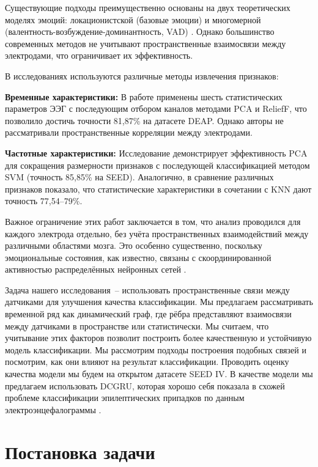 \documentclass[12pt, twoside]{article}
\begin{document}
Существующие подходы преимущественно основаны на двух теоретических моделях эмоций: локационистской (базовые эмоции) и многомерной (валентность-возбуждение-доминантность, VAD) \cite{3}. Однако большинство современных методов не учитывают пространственные взаимосвязи между электродами, что ограничивает их эффективность.

В исследованиях используются различные методы извлечения признаков:

\textbf{Временные характеристики:} В работе \cite{4} применены шесть статистических параметров ЭЭГ с последующим отбором каналов методами PCA и ReliefF, что позволило достичь точности 81{,}87\% на датасете DEAP. Однако авторы не рассматривали пространственные корреляции между электродами.

\textbf{Частотные характеристики:} Исследование \cite{5} демонстрирует эффективность PCA для сокращения размерности признаков с последующей классификацией методом SVM (точность 85{,}85\% на SEED). Аналогично, в \cite{6} сравнение различных признаков показало, что статистические характеристики в сочетании с KNN дают точность 77{,}54--79\%.

Важное ограничение этих работ заключается в том, что анализ проводился для каждого электрода отдельно, без учёта пространственных взаимодействий между различными областями мозга. Это особенно существенно, поскольку эмоциональные состояния, как известно, связаны с скоординированной активностью распределённых нейронных сетей \cite{7}.

Задача нашего исследования~-- использовать пространственные связи между датчиками для улучшения качества классификации. Мы предлагаем рассматривать временной ряд как динамический граф, где рёбра представляют взаимосвязи между датчиками в пространстве или статистически. Мы считаем, что учитывание этих факторов позволит построить более качественную и устойчивую модель классификации. Мы рассмотрим подходы построения подобных связей и посмотрим, как они влияют на результат классификации. Проводить оценку качества модели мы будем на открытом датасете SEED IV. В качестве модели мы предлагаем использовать DCGRU, которая хорошо себя показала в схожей проблеме классификации эпилептических припадков по данным электроэнцефалограммы \cite{DCGRU}.



\section{Постановка задачи}
\end{document}
